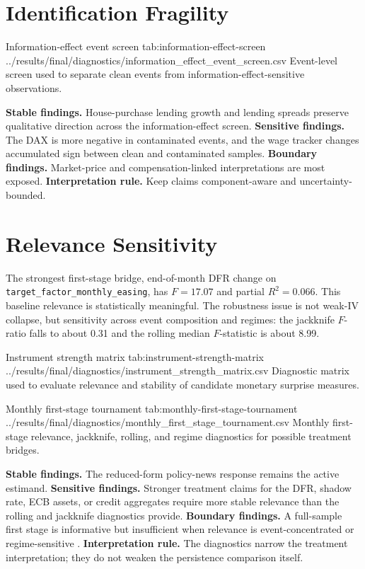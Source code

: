 \section{Identification Fragility}

\artifacttable
  {Information-effect event screen}
  {tab:information-effect-screen}
  {../results/final/diagnostics/information_effect_event_screen.csv}
  {Event-level screen used to separate clean events from information-effect-sensitive observations.}

\noindent\textbf{Stable findings.} House-purchase lending growth and lending spreads preserve qualitative direction across the information-effect screen. \textbf{Sensitive findings.} The DAX is more negative in contaminated events, and the wage tracker changes accumulated sign between clean and contaminated samples. \textbf{Boundary findings.} Market-price and compensation-linked interpretations are most exposed. \textbf{Interpretation rule.} Keep claims component-aware and uncertainty-bounded.

\section{Relevance Sensitivity}

The strongest first-stage bridge, end-of-month DFR change on \nolinkurl{target_factor_monthly_easing}, has \(F=17.07\) and partial \(R^2=0.066\). This baseline relevance is statistically meaningful. The robustness issue is not weak-IV collapse, but sensitivity across event composition and regimes: the jackknife \(F\)-ratio falls to about 0.31 and the rolling median \(F\)-statistic is about 8.99.

\artifacttable
  {Instrument strength matrix}
  {tab:instrument-strength-matrix}
  {../results/final/diagnostics/instrument_strength_matrix.csv}
  {Diagnostic matrix used to evaluate relevance and stability of candidate monetary surprise measures.}

\artifacttable
  {Monthly first-stage tournament}
  {tab:monthly-first-stage-tournament}
  {../results/final/diagnostics/monthly_first_stage_tournament.csv}
  {Monthly first-stage relevance, jackknife, rolling, and regime diagnostics for possible treatment bridges.}

\noindent\textbf{Stable findings.} The reduced-form policy-news response remains the active estimand. \textbf{Sensitive findings.} Stronger treatment claims for the DFR, shadow rate, ECB assets, or credit aggregates require more stable relevance than the rolling and jackknife diagnostics provide. \textbf{Boundary findings.} A full-sample first stage is informative but insufficient when relevance is event-concentrated or regime-sensitive \parencite{StockYogo2005}. \textbf{Interpretation rule.} The diagnostics narrow the treatment interpretation; they do not weaken the persistence comparison itself.

